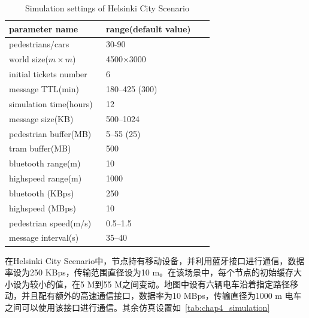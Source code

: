 \begin{table}
\centering
\caption{Simulation settings of Helsinki City Scenario}
\label{tab:chap4_simulation_helsinki}
\begin{tabular}{
p{0.45\linewidth}<{\centering}
p{0.5\linewidth}<{\centering}
}
\hline
\textbf{parameter name} & \textbf{range(default value)} \\
\hline
pedestrians/cars & 30-90  \\
world size($m\times m$) & 4500$\times$3000  \\
initial tickets number & 6 \\
message TTL(min) & 180--425 (300) \\
simulation time(hours) & 12 \\
message size(KB) & 500--1024 \\
pedestrian buffer(MB) & 5--55 (25) \\
tram buffer(MB) & 500 \\
bluetooth range(m) & 10 \\
highspeed range(m) & 1000 \\ 
bluetooth (KBps) & 250 \\
highspeed (MBps) & 10 \\ 
pedestrian speed(m/s) & 0.5--1.5  \\
message interval(s) & 35--40 \\
\hline
\end{tabular}
\end{table}

在Helsinki City Scenario中，节点持有移动设备，并利用蓝牙接口进行通信，数据率设为250 KBps，传输范围直径设为10 m。在该场景中，每个节点的初始缓存大小设为较小的值，在5 M到55 M之间变动。地图中设有六辆电车沿着指定路径移动，并且配有额外的高速通信接口，数据率为10 MBps，传输直径为1000 m 电车之间可以使用该接口进行通信。其余仿真设置如\tablename~\ref{tab:chap4_simulation}

